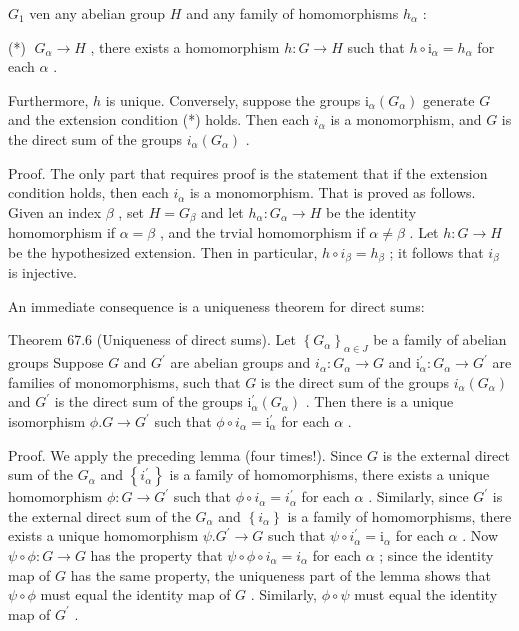 \documentclass[10pt]{article}
\begin{document}
\({G}_{1}\) ven any abelian group \(H\) and any family of homomorphisms \({h}_{\alpha }\) :

(*) \(\;{G}_{\alpha } \rightarrow  H\) , there exists a homomorphism \(h : G \rightarrow  H\) such that \(h \circ  {\mathrm{i}}_{\alpha } = {h}_{\alpha }\) for each \(\alpha\) .

Furthermore, \(h\) is unique. Conversely, suppose the groups \({\mathrm{i}}_{\alpha }\left( {G}_{\alpha }\right)\) generate \(G\) and the extension condition (*) holds. Then each \({i}_{\alpha }\) is a monomorphism, and \(G\) is the direct sum of the groups \({i}_{\alpha }\left( {G}_{\alpha }\right)\) .

Proof. The only part that requires proof is the statement that if the extension condition holds, then each \({i}_{\alpha }\) is a monomorphism. That is proved as follows. Given an index \(\beta\) , set \(H = {G}_{\beta }\) and let \({h}_{\alpha } : {G}_{\alpha } \rightarrow  H\) be the identity homomorphism if \(\alpha  = \beta\) , and the trvial homomorphism if \(\alpha  \neq  \beta\) . Let \(h : G \rightarrow  H\) be the hypothesized extension. Then in particular, \(h \circ  {i}_{\beta } = {h}_{\beta }\) ; it follows that \({i}_{\beta }\) is injective.

An immediate consequence is a uniqueness theorem for direct sums:

Theorem 67.6 (Uniqueness of direct sums). Let \({\left\{  {G}_{\alpha }\right\}  }_{\alpha  \in  J}\) be a family of abelian groups Suppose \(G\) and \({G}^{\prime }\) are abelian groups and \({i}_{\alpha } : {G}_{\alpha } \rightarrow  G\) and \({\mathrm{i}}_{\alpha }^{\prime } : {G}_{\alpha } \rightarrow  {G}^{\prime }\) are families of monomorphisms, such that \(G\) is the direct sum of the groups \({i}_{\alpha }\left( {G}_{\alpha }\right)\) and \({G}^{\prime }\) is the direct sum of the groups \({\mathrm{i}}_{\alpha }^{\prime }\left( {G}_{\alpha }\right)\) . Then there is a unique isomorphism \(\phi .G \rightarrow  {G}^{\prime }\) such that \(\phi  \circ  {i}_{\alpha } = {\mathrm{i}}_{\alpha }^{\prime }\) for each \(\alpha\) .

Proof. We apply the preceding lemma (four times!). Since \(G\) is the external direct sum of the \({G}_{\alpha }\) and \(\left\{  {i}_{\alpha }^{\prime }\right\}\) is a family of homomorphisms, there exists a unique homomorphism \(\phi  : G \rightarrow  {G}^{\prime }\) such that \(\phi  \circ  {i}_{\alpha } = {i}_{\alpha }^{\prime }\) for each \(\alpha\) . Similarly, since \({G}^{\prime }\) is the external direct sum of the \({G}_{\alpha }\) and \(\left\{  {i}_{\alpha }\right\}\) is a family of homomorphisms, there exists a unique homomorphism \(\psi .{G}^{\prime } \rightarrow  G\) such that \(\psi  \circ  {i}_{\alpha }^{\prime } = {\mathrm{i}}_{\alpha }\) for each \(\alpha\) . Now \(\psi  \circ  \phi  : G \rightarrow  G\) has the property that \(\psi  \circ  \phi  \circ  {i}_{\alpha } = {i}_{\alpha }\) for each \(\alpha\) ; since the identity map of \(G\) has the same property, the uniqueness part of the lemma shows that \(\psi  \circ  \phi\) must equal the identity map of \(G\) . Similarly, \(\phi  \circ  \psi\) must equal the identity map of \({G}^{\prime }\) .
\end{document}
